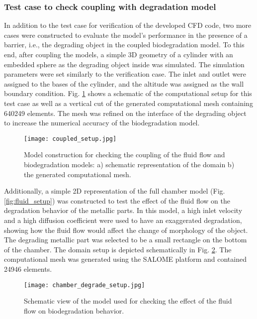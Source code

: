 \subsubsection{Test case to check coupling with degradation model}

In addition to the test case for verification of the developed \gls{CFD} code, two more cases were constructed to evaluate the model's performance in the presence of a barrier, i.e., the degrading object in the coupled biodegradation model. To this end, after coupling the models, a simple 3D geometry of a cylinder with an embedded sphere as the degrading object inside was simulated. The simulation parameters were set similarly to the verification case. The inlet and outlet were assigned to the bases of the cylinder, and the altitude was assigned as the wall boundary condition. Fig. \ref{fig:fluid_coupled_setup} shows a schematic of the computational setup for this test case as well as a vertical cut of the generated computational mesh containing \num{640249} elements. The mesh was refined on the interface of the degrading object to increase the numerical accuracy of the biodegradation model.


\begin{figure}[h]
\centering
\medskip
\texttt{[image: coupled\_setup.jpg]}
\caption[Model construction for checking the coupling of the fluid flow and biodegradation models]{Model construction for checking the coupling of the fluid flow and biodegradation models: a) schematic representation of the domain b) the generated computational mesh.} \label{fig:fluid_coupled_setup}
\end{figure}

Additionally, a simple 2D representation of the full chamber model (Fig. \ref{fig:fluid_setup}) was constructed to test the effect of the fluid flow on the degradation behavior of the metallic parts. In this model, a high inlet velocity and a high diffusion coefficient were used to have an exaggerated degradation, showing how the fluid flow would affect the change of morphology of the object. The degrading metallic part was selected to be a small rectangle on the bottom of the chamber. The domain setup is depicted schematically in Fig. \ref{fig:fluid_chamber_degrade_setup}. The computational mesh was generated using the SALOME platform and contained \num{24946} elements.

\begin{figure}[h]
\centering
\medskip
\texttt{[image: chamber\_degrade\_setup.jpg]}
\caption[Schematic view of the model for checking the effect of fluid flow on biodegradation behavior]{Schematic view of the model used for checking the effect of the fluid flow on biodegradation behavior.} \label{fig:fluid_chamber_degrade_setup}
\end{figure}

